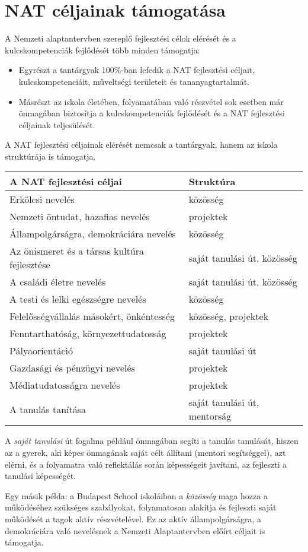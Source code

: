 \hypertarget{nat-celjainak-tamogatasa}{%
\section{NAT céljainak támogatása}\label{nat-celjainak-tamogatasa}}

A Nemzeti alaptantervben szereplő fejlesztési célok elérését és a
kulcskompetenciák fejlődését több minden támogatja:

\begin{itemize}
\tightlist
\item
  Egyrészt a tantárgyak 100\%-ban lefedik a NAT fejlesztési céljait,
  kulcskompetenciáit, műveltségi területeit és tananyagtartalmát.
\item
  Másrészt az iskola életében, folyamatában való részvétel sok esetben
  már önmagában
  biztosítja a kulcskompetenciák fejlődését és a NAT fejlesztési
  céljainak teljesülését.
\end{itemize}

A NAT fejlesztési céljainak elérését nemcsak a tantárgyak, hanem az
iskola struktúrája is támogatja.

\begin{longtable}[]{@{}ll@{}}
\toprule
\textbf{A NAT fejlesztési céljai} & \textbf{Struktúra}\tabularnewline
\midrule
\endhead
Erkölcsi nevelés & közösség\tabularnewline
Nemzeti öntudat, hazafias nevelés & projektek\tabularnewline
Állampolgárságra, demokráciára nevelés & közösség\tabularnewline
Az önismeret és a társas kultúra fejlesztése & saját tanulási út,
közösség\tabularnewline
A családi életre nevelés & saját tanulási út, közösség\tabularnewline
A testi és lelki egészségre nevelés & közösség\tabularnewline
Felelősségvállalás másokért, önkéntesség & közösség,
projektek\tabularnewline
Fenntarthatóság, környezettudatosság & projektek\tabularnewline
Pályaorientáció & saját tanulási út\tabularnewline
Gazdasági és pénzügyi nevelés & projektek\tabularnewline
Médiatudatosságra nevelés & projektek\tabularnewline
A tanulás tanítása & saját tanulási út, mentorság\tabularnewline
\bottomrule
\end{longtable}

A \emph{saját tanulási} út fogalma például önmagában segíti a tanulás
tanulását, hiszen az a gyerek, aki képes önmagának saját célt állítani
(mentori segítséggel), azt elérni, és a folyamatra való reflektálás
során képességeit javítani, az fejleszti a tanulási képességét.

Egy másik példa: a Budapest School iskoláiban a \emph{közösség}
maga hozza a működéséhez szükséges szabályokat, folyamatosan alakítja és
fejleszti saját működését a tagok aktív részvételével. Ez az aktív
állampolgárságra, a demokráciára való nevelésnek a Nemzeti Alaptantervben
előírt céljait is támogatja.

